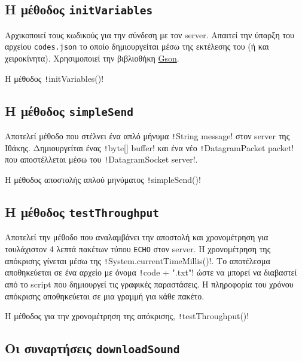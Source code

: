 \subsection{Η μέθοδος \texttt{initVariables}}\label{section:initVariables}
Αρχικοποιεί τους κωδικούς για την σύνδεση με τον server.
Απαιτεί την ύπαρξη του αρχείου \texttt{codes.json} το οποίο δημιουργείται μέσω της εκτέλεσης του \scriptname{} (ή και χειροκίνητα).
Χρησιμοποιεί την βιβλιοθήκη \hyperref[lib:Gson]{Gson}.
\begin{code}
\caption{Η μέθοδος \texttt!initVariables()!}
\end{code}

\subsection{Η μέθοδος \texttt{simpleSend}}\label{section:simpleSend}
Αποτελεί μέθοδο που στέλνει ένα απλό μήνυμα \texttt!String message! στον server της Ιθάκης.
Δημιουργείται ένας \texttt!byte[] buffer! και ένα νέο \texttt!DatagramPacket packet! που αποστέλλεται μέσω του \texttt!DatagramSocket server!.
\begin{code}
\caption{Η μέθοδος αποστολής απλού μηνύματος \texttt!simpleSend()!}
\end{code}

\subsection{Η μέθοδος \texttt{testThroughput}}
Αποτελεί την μέθοδο που αναλαμβάνει την αποστολή και χρονομέτρηση για τουλάχιστον 4 λεπτά πακέτων τύπου \texttt{ECHO} στον server.
Η χρονομέτρηση της απόκρισης γίνεται μέσω της \texttt!System.currentTimeMillis()!.
Το αποτέλεσμα αποθηκεύεται σε ένα αρχείο με όνομα \texttt!code + ".txt"! ώστε να μπορεί να διαβαστεί από το script που δημιουργεί τις γραφικές παραστάσεις.
Η πληροφορία του χρόνου απόκρισης αποθηκεύεται σε μια γραμμή για κάθε πακέτο.
\begin{code}
\caption{Η μέθοδος για την χρονομέτρηση της απόκρισης, \texttt!testThroughput()!}
\end{code}

\subsection{Οι συναρτήσεις \texttt{downloadSound}}\label{section:downloadSound}
